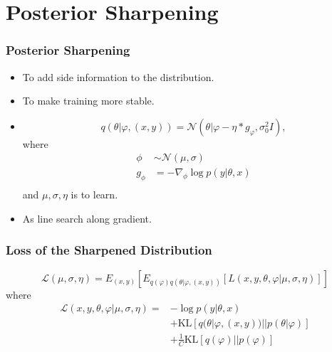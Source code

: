 \section{Posterior Sharpening}

\begin{frame}
  \frametitle{Posterior Sharpening}  
  \begin{itemize}
  \item To add side information to the distribution.
  \item To make training more stable.
  \item
    \begin{equation*}
      q(\theta | \varphi, (x,y)) = \mathcal{N}(\theta|\varphi - \eta * g_{\varphi} , \sigma_0^2I),
    \end{equation*}
    where
    \begin{align*}
      \phi &\sim \mathcal{N}(\mu, \sigma) \\
      g_\phi &= -\nabla_\phi \log p(y|\theta,x) \\    
    \end{align*}
    and $\mu, \sigma, \eta$ is to learn.
  \item As line search along gradient.
\end{itemize}
\end{frame}


\begin{frame}
  \frametitle{Loss of the Sharpened Distribution}
  \begin{equation}
    \mathcal{L}(\mu,\sigma,\eta)=E_{(x,y)}[E_{q(\varphi)q(\theta | \varphi, (x,y))}  [L(x,y, \theta,\varphi|\mu,\sigma,\eta)]]     \label{eq:sharpen-loss}
  \end{equation}
  where
  \begin{align*}
    \mathcal{L}(x,y, \theta,\varphi|\mu,\sigma,\eta)
    =& -\log p(y|\theta,x) \\
     & + \mathrm{KL}[q(\theta|\varphi, (x,y)) || p(\theta|\varphi)] \\
     & + \frac{1}{C} \mathrm{KL}[q(\varphi) || p(\varphi)]
  \end{align*}
\end{frame}


